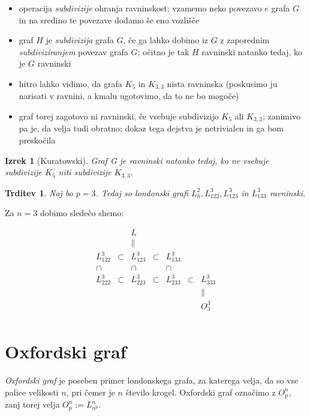 \documentclass[11pt,a4paper]{article}
\theoremstyle{definition} %
\theoremstyle{plain} %
\newtheorem{izrek}[definicija]{Izrek}
\newtheorem{trditev}[definicija]{Trditev}
\begin{document}
\begin{itemize}
    \item operacija \emph{subdivizije} ohranja ravninskost: vzamemo neko povezavo $e$ grafa $G$ in na sredino te povezave dodamo še eno vozlišče 
    \item graf $H$ je \emph{subdivizija} grafa $G$, če ga lahko dobimo iz $G$ z zaporednim \emph{subdiviziranjem} povezav grafa $G$; očitno je tak $H$ ravninski natanko tedaj, ko je $G$ ravninski
    \item hitro lahko vidimo, da grafa $K_5$ in $K_{3,3}$ nista ravninska (poskusimo ju narisati v ravnini, a kmalu ugotovimo, da to ne bo mogoče)
    \item graf torej zagotovo ni ravninski, če vsebuje subdivizijo $K_5$ ali $K_{3,3}$; zanimivo pa je, da velja tudi obratno; dokaz tega dejstva je netrivialen in ga bom preskočila
\end{itemize}

\medskip

\begin{izrek}[Kuratowski]
    Graf G je ravninski natanko tedaj, ko ne vsebuje subdivizije $K_5$ niti subdivizije $K_{3,3}$.
\end{izrek}

\begin{trditev}
    Naj bo $p=3$. Tedaj so londonski grafi $L_h^2, L_{122}^3,L_{123}^3$ in $ L_{133}^3$ ravninski.
\end{trditev}

Za $n=3$ dobimo sledečo shemo:

\[
\begin{matrix}
& & L & & & & \\
& & \parallel & & & & \\
L_{122}^3 & \subset & L_{123}^3 & \subset & L_{133}^3 & & \\
\cap & & \cap & & \cap & & \\
L_{222}^3 & \subset & L_{223}^3 & \subset & L_{233}^3 & \subset & L_{333}^3 \\
& & & & & & \parallel \\
& & & & & & O^3_3 \\
\end{matrix}
\]


\section{Oxfordski graf}

\emph{Oxfordski graf} je poseben primer londonskega grafa, za katerega velja, da so vse palice velikosti $n$, pri čemer je $n$ število krogel. Oxfordski graf označimo z $O^n_p$, zanj torej velja $O^n_p := L^n_{n^p}$.
\end{document}
